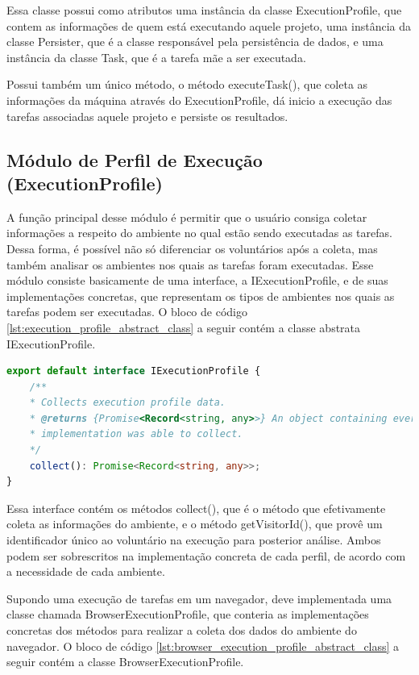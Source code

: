 \documentclass[12pt]{tcc}
\begin{document}
Essa classe possui como atributos uma instância da classe ExecutionProfile, que contem as informações de quem está executando aquele projeto, uma instância da classe Persister, que é a classe responsável pela persistência de dados, e uma instância da classe Task, que é a tarefa mãe a ser executada.

Possui também um único método, o método executeTask(), que coleta as informações da máquina através do ExecutionProfile, dá inicio a execução das tarefas associadas aquele projeto e persiste os resultados.

\subsection{Módulo de Perfil de Execução (ExecutionProfile)}
\label{subsection:modulo-execution-profile}

A função principal desse módulo é permitir que o usuário consiga coletar informações a respeito do ambiente no qual estão sendo executadas as tarefas. Dessa forma, é possível não só diferenciar os voluntários após a coleta, mas também analisar os ambientes nos quais as tarefas foram executadas. Esse módulo consiste basicamente de uma interface, a IExecutionProfile, e de suas implementações concretas, que representam os tipos de ambientes nos quais as tarefas podem ser executadas. O bloco de código \ref{lst:execution_profile_abstract_class} a seguir contém a classe abstrata IExecutionProfile.

\begin{lstlisting}[label={lst:execution_profile_abstract_class}, caption={Implementação da classe responsável por representar um perfil de execução.}, language=TypeScript, breaklines=true]
export default interface IExecutionProfile {
	/**
	* Collects execution profile data.
	* @returns {Promise<Record<string, any>>} An object containing every execution profile data the
	* implementation was able to collect.
	*/
	collect(): Promise<Record<string, any>>;
}
\end{lstlisting}

Essa interface contém os métodos collect(), que é o método que efetivamente coleta as informações do ambiente, e o método getVisitorId(), que provê um identificador único ao voluntário na execução para posterior análise. Ambos podem ser sobrescritos na implementação concreta de cada perfil, de acordo com a necessidade de cada ambiente.

Supondo uma execução de tarefas em um navegador, deve implementada uma classe chamada BrowserExecutionProfile, que conteria as implementações concretas dos métodos para realizar a coleta dos dados do ambiente do navegador. O bloco de código \ref{lst:browser_execution_profile_abstract_class} a seguir contém a classe BrowserExecutionProfile.
\end{document}

